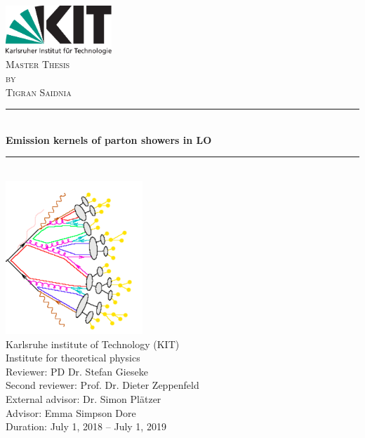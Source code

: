 \begin{titlepage}

\begin{center}


\includegraphics[width=0.3\textwidth]{images/Intro/kitlogo_de_rgb}\\[1cm]    

\textsc{\LARGE Master Thesis}\\[0.5cm]
\textsc{\Large by}\\[0.5cm]
\textsc{\Large Tigran Saidnia}\\[1.0cm]


\newcommand{\HRule}{\rule{\linewidth}{0.5mm}}
\HRule \\[0.8mm]
{\textbf{\Large \bfseries Emission kernels of parton showers in LO}}\\[0.8mm]


\HRule \\[1cm]
\includegraphics[scale=0.7]{images/Intro/footPicture.PNG}\\[0.8cm]   

\Large Karlsruhe institute of Technology (KIT)\\[1.5mm]
\Large Institute for theoretical physics\\[1.0cm]

{\Large Reviewer: PD Dr. Stefan Gieseke \\
\Large Second reviewer: Prof. Dr. Dieter Zeppenfeld\\
\Large External advisor: Dr. Simon Plätzer\\
\Large Advisor: Emma Simpson Dore}\\[0.8cm]   

Duration: July 1, 2018  –  July 1, 2019

\vfill


\end{center}

\end{titlepage}